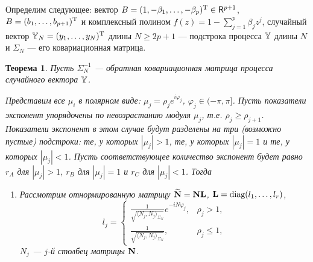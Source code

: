 \documentclass[12pt,a4paper]{article}
\newtheorem{theorem}{Теорема}
\begin{document}
Определим следующее: вектор $B = (1, -\beta_1, \ldots, -\beta_p)^{\mathrm{T}} \in \mathsf{R}^{p+1}$, $B = (b_1, \ldots, b_{p+1})^{\mathrm{T}}$ и комплексный полином $f(z) = 1 - \sum_{j=1}^p \beta_j z^j$, случайный вектор $\mathbb{Y}_N = (y_1, \ldots, y_N)^{\mathrm{T}}$ длины $N \ge 2p + 1$ --- подстрока процесса $\mathbb{Y}$ длины $N$ и $\Sigma_N$ --- его ковариационная матрица.

\begin{theorem} \label{th:arinconsistency}
	Пусть $\Sigma_N^{-1}$ --- обратная ковариационная матрица процесса случайного вектора $\mathbb{Y}$.
	
	Представим все $\mu_i$ в полярном виде: $\mu_j = \rho_j e^{i \varphi_j}$, $\varphi_j \in (-\pi, \pi]$. Пусть показатели экспонент упорядочены по невозрастанию модуля $\mu_j$, т.е. $\rho_j \ge \rho_{j+1}$. Показатели экспонент в этом случае будут разделены на три (возможно пустые) подстроки: те, у которых $|\mu_j|>1$, те, у которых $|\mu_j| = 1$ и те, у которых $|\mu_j| < 1$. Пусть соответствующее количество экспонент будет равно $r_A$ для $|\mu_j|>1$, $r_B$ для $|\mu_j|=1$ и $r_C$ для $|\mu_j|<1$. Тогда
	\begin{enumerate}
		\item Рассмотрим отнормированную матрицу $\widetilde {\mathbf{N}} = \mathbf{N} \mathbf{L}$, $\mathbf{L} = \text{diag}(l_1, \ldots, l_r)$, 
		\begin{equation*}
		l_j = \begin{cases}
		\frac{1}{\sqrt{\langle N_j, N_j \rangle_{\Sigma_N}}} e^{-i N \varphi_j}, & \rho_j > 1, \\
		\frac{1}{\sqrt{\langle N_j, N_j \rangle_{\Sigma_N}}}, & \rho_j \le 1,
		\end{cases}
		\end{equation*}
		$N_j$ --- $j$-й столбец матрицы $\mathbf{N}$.
		

\end{enumerate}
\end{theorem}
\end{document}
